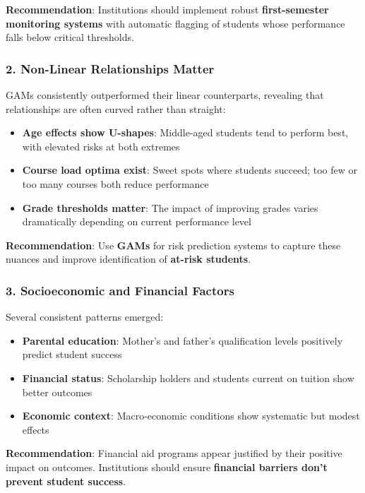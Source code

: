 \documentclass[
]{article}
\providecommand{\tightlist}{%
  \setlength{\itemsep}{0pt}\setlength{\parskip}{0pt}}
\begin{document}
\textbf{Recommendation}: Institutions should implement robust
\textbf{first-semester monitoring systems} with automatic flagging of
students whose performance falls below critical thresholds.

\subsubsection{2. Non-Linear Relationships
Matter}\label{non-linear-relationships-matter}

GAMs consistently outperformed their linear counterparts, revealing that
relationships are often curved rather than straight:

\begin{itemize}
\tightlist
\item
  \textbf{Age effects show U-shapes}: Middle-aged students tend to
  perform best, with elevated risks at both extremes
\item
  \textbf{Course load optima exist}: Sweet spots where students succeed;
  too few or too many courses both reduce performance
\item
  \textbf{Grade thresholds matter}: The impact of improving grades
  varies dramatically depending on current performance level
\end{itemize}

\textbf{Recommendation}: Use \textbf{GAMs} for risk prediction systems
to capture these nuances and improve identification of \textbf{at-risk
students}.

\subsubsection{3. Socioeconomic and Financial
Factors}\label{socioeconomic-and-financial-factors}

Several consistent patterns emerged:

\begin{itemize}
\tightlist
\item
  \textbf{Parental education}: Mother's and father's qualification
  levels positively predict student success
\item
  \textbf{Financial status}: Scholarship holders and students current on
  tuition show better outcomes
\item
  \textbf{Economic context}: Macro-economic conditions show systematic
  but modest effects
\end{itemize}

\textbf{Recommendation}: Financial aid programs appear justified by
their positive impact on outcomes. Institutions should ensure
\textbf{financial barriers don't prevent student success}.
\end{document}
